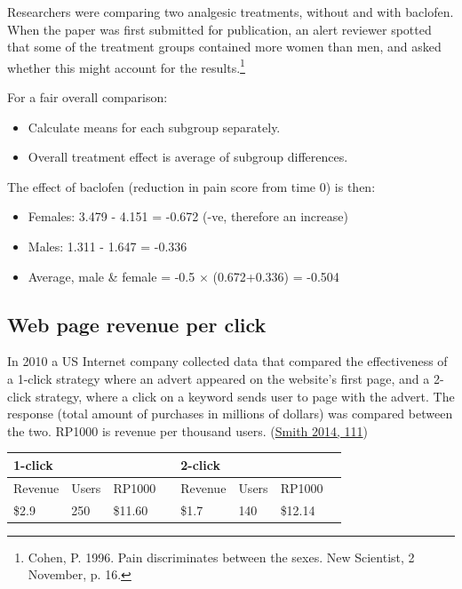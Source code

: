 \documentclass[
  10pt,
  b5paper]{book}
\providecommand{\tightlist}{%
  \setlength{\itemsep}{0pt}\setlength{\parskip}{0pt}}
\begin{document}
Researchers were comparing two
analgesic treatments, without and with baclofen. When the paper was
first submitted for publication, an alert reviewer spotted that some
of the treatment groups contained more women than men, and asked
whether this might account for the
results.\footnote{Cohen, P. 1996. Pain discriminates between the
sexes.  New Scientist, 2 November, p. 16.}

For a fair overall comparison:

\begin{itemize}
\tightlist
\item
  Calculate means for each subgroup separately.
\item
  Overall treatment effect is average of subgroup differences.
\end{itemize}

The effect of baclofen (reduction in pain score from time 0) is then:

\begin{itemize}
\tightlist
\item
  Females: 3.479 - 4.151 = -0.672 (-ve, therefore an increase)
\item
  Males: 1.311 - 1.647 = -0.336
\item
  Average, male \& female = -0.5 \(\times\) (0.672+0.336) = -0.504
\end{itemize}

\hypertarget{web-page-revenue-per-click}{%
\subsection*{Web page revenue per click}\label{web-page-revenue-per-click}}

In 2010 a US Internet company collected data that compared the effectiveness
of a 1-click strategy where an advert appeared on the website's first page,
and a 2-click strategy, where a click on a keyword sends user to page with
the advert. The response (total amount of purchases in millions of dollars)
was compared between the two. RP1000 is revenue per thousand users.
(\protect\hyperlink{ref-smith-sd}{Smith 2014, 111})

\begin{longtable}[]{@{}llllllll@{}}
\toprule
1-click & & & & 2-click & & & \\
\midrule
\endhead
Revenue & Users & RP1000 & & Revenue & Users & RP1000 & \\
\$2.9 & 250 & \$11.60 & & \$1.7 & 140 & \$12.14 & \\
\bottomrule
\end{longtable}
\end{document}

